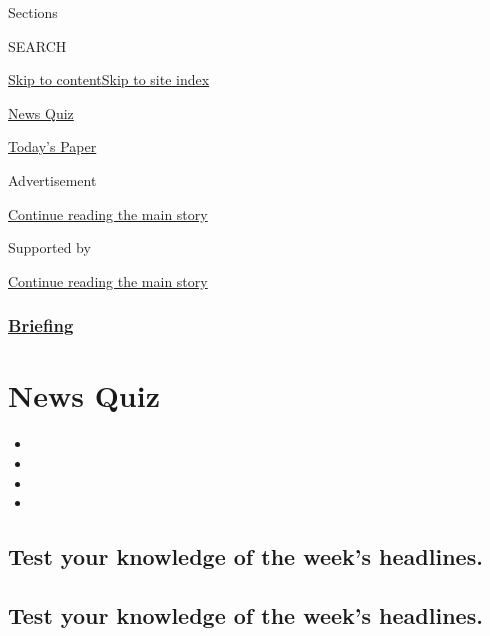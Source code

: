 Sections

SEARCH

\protect\hyperlink{site-content}{Skip to
content}\protect\hyperlink{site-index}{Skip to site index}

\href{https://www.nytimes.com/spotlight/news-quiz}{News Quiz}

\href{https://myaccount.nytimes.com/auth/login?response_type=cookie\&client_id=vi}{}

\href{https://www.nytimes.com/section/todayspaper}{Today's Paper}

Advertisement

\protect\hyperlink{after-top}{Continue reading the main story}

Supported by

\protect\hyperlink{after-sponsor}{Continue reading the main story}

\hypertarget{briefing}{%
\subsubsection{\texorpdfstring{\href{/interactive/2018/briefing/global-morning-briefing-newsletter-signup.html}{Briefing}}{Briefing}}\label{briefing}}

\hypertarget{news-quiz}{%
\section{News Quiz}\label{news-quiz}}

\begin{itemize}
\item
\item
\item
\item
\end{itemize}

\hypertarget{test-your-knowledge-of-the-weeks-headlines}{%
\subsection{Test your knowledge of the week's
headlines.}\label{test-your-knowledge-of-the-weeks-headlines}}

\hypertarget{test-your-knowledge-of-the-weeks-headlines-1}{%
\subsection{Test your knowledge of the week's
headlines.}\label{test-your-knowledge-of-the-weeks-headlines-1}}

